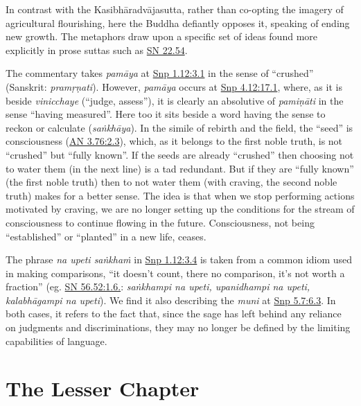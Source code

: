 \documentclass[12pt,openany]{book}%
\begin{document}
In contrast with the \textsanskrit{Kasibhāradvājasutta}, rather than co-opting the imagery of agricultural flourishing, here the Buddha defiantly opposes it, speaking of ending new growth. The metaphors draw upon a specific set of ideas found more explicitly in prose suttas such as \href{https://suttacentral.net/sn22.54/en/sujato}{SN 22.54}.

The commentary takes \textit{\textsanskrit{pamāya}} at \href{https://suttacentral.net/snp1.12/en/sujato\#3.1}{Snp 1.12:3.1} in the sense of “crushed” (Sanskrit: \textit{\textsanskrit{pramṛṇati}}). However, \textit{\textsanskrit{pamāya}} occurs at \href{https://suttacentral.net/snp4.12/en/sujato\#17.1}{Snp 4.12:17.1}, where, as it is beside \textit{vinicchaye} (“judge, assess”), it is clearly an absolutive of \textit{\textsanskrit{pamiṇāti}} in the sense “having measured”. Here too it sits beside a word having the sense to reckon or calculate (\textit{\textsanskrit{saṅkhāya}}). In the simile of rebirth and the field, the “seed” is consciousness (\href{https://suttacentral.net/an3.76/en/sujato\#2.3}{AN 3.76:2.3}), which, as it belongs to the first noble truth, is not “crushed” but “fully known”. If the seeds are already “crushed” then choosing not to water them (in the next line) is a tad redundant. But if they are “fully known” (the first noble truth) then to not water them (with craving, the second noble truth) makes for a better sense. The idea is that when we stop performing actions motivated by craving, we are no longer setting up the conditions for the stream of consciousness to continue flowing in the future. Consciousness, not being “established” or “planted” in a new life, ceases.

The phrase \textit{na upeti \textsanskrit{saṅkhaṁ}} in \href{https://suttacentral.net/snp1.12/en/sujato\#3.4}{Snp 1.12:3.4} is taken from a common idiom used in making comparisons, “it doesn’t count, there no comparison, it’s not worth a fraction” (eg. \href{https://suttacentral.net/sn56.52/en/sujato\#1.6.}{SN 56.52:1.6.}: \textit{\textsanskrit{saṅkhampi} na upeti, upanidhampi na upeti, \textsanskrit{kalabhāgampi} na upeti}). We find it also describing the \textit{muni} at \href{https://suttacentral.net/snp5.7/en/sujato\#6.3}{Snp 5.7:6.3}. In both cases, it refers to the fact that, since the sage has left behind any reliance on judgments and discriminations, they may no longer be defined by the limiting capabilities of language.

\section*{The Lesser Chapter}
\end{document}
